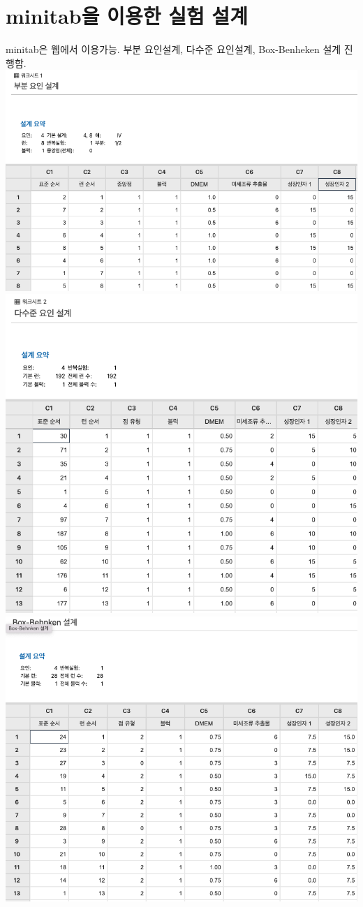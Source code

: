 \documentclass{article}
\begin{document}
    \section{minitab을 이용한 실험 설계}
    minitab은 웹에서 이용가능. 
    부분 요인설계, 다수준 요인설계, Box-Benheken 설계 진행함.\\
    \includegraphics[scale=0.5]{min3.png}
    \includegraphics[scale=0.5]{min2.png}
    \includegraphics[scale=0.5]{box-behnken.png}
\end{document}
